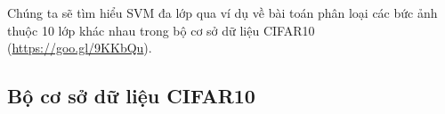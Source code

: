  
 
 
 
 
 
Chúng ta sẽ tìm hiểu SVM đa lớp qua ví dụ về bài toán phân loại các bức ảnh thuộc 10 lớp khác nhau trong bộ cơ sở dữ liệu CIFAR10 (\url{https://goo.gl/9KKbQu}). 

\subsection{Bộ cơ sở dữ liệu CIFAR10}
 
